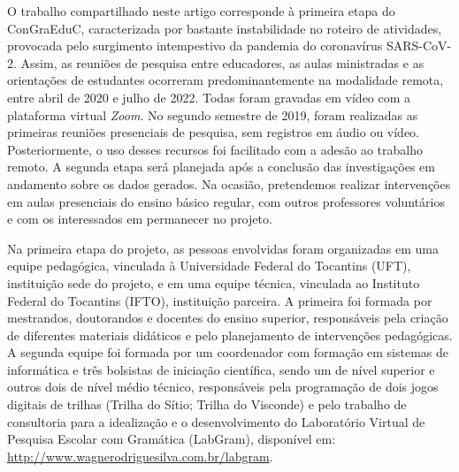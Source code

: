 O trabalho compartilhado neste artigo corresponde à primeira etapa do
ConGraEduC, caracterizada por bastante instabilidade no roteiro de
atividades, provocada pelo surgimento intempestivo da pandemia do
coronavírus SARS-CoV-2. Assim, as reuniões de pesquisa entre educadores,
as aulas ministradas e as orientações de estudantes ocorreram
predominantemente na modalidade remota, entre abril de 2020 e julho de
2022. Todas foram gravadas em vídeo com a plataforma virtual
\emph{Zoom}. No segundo semestre de 2019, foram realizadas as primeiras
reuniões presenciais de pesquisa, sem registros em áudio ou vídeo.
Posteriormente, o uso desses recursos foi facilitado com a adesão ao
trabalho remoto. A segunda etapa será planejada após a conclusão das
investigações em andamento sobre os dados gerados. Na ocasião,
pretendemos realizar intervenções em aulas presenciais do ensino básico
regular, com outros professores voluntários e com os interessados em
permanecer no projeto.



Na primeira etapa do projeto, as pessoas envolvidas foram organizadas em
uma equipe pedagógica, vinculada à Universidade Federal do Tocantins
(UFT), instituição sede do projeto, e em uma equipe técnica, vinculada
ao Instituto Federal do Tocantins (IFTO), instituição parceira. A
primeira foi formada por mestrandos, doutorandos e docentes do ensino
superior, responsáveis pela criação de diferentes materiais didáticos e
pelo planejamento de intervenções pedagógicas. A segunda equipe foi
formada por um coordenador com formação em sistemas de informática e
três bolsistas de iniciação científica, sendo um de nível superior e
outros dois de nível médio técnico, responsáveis pela programação de
dois jogos digitais de trilhas (Trilha do Sítio; Trilha do Visconde) e
pelo trabalho de consultoria para a idealização e o desenvolvimento do
Laboratório Virtual de Pesquisa Escolar com Gramática (LabGram),
disponível em:
\url{http://www.wagnerodriguesilva.com.br/labgram}.



